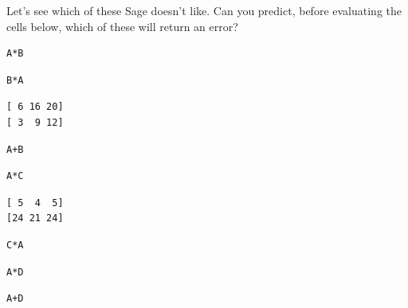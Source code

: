 \documentclass[10pt,]{book}
\theoremstyle{plain}
\theoremstyle{definition}
\numberwithin{equation}{section}
\begin{document}
      Let's see which of these Sage doesn't like. Can you predict, before
      evaluating the cells below, which of these will return an error?
\begin{lstlisting}[style=sageinput]
A*B
\end{lstlisting}
\begin{lstlisting}[style=sageinput]
B*A
\end{lstlisting}
\begin{lstlisting}[style=sageoutput]
[ 6 16 20]
[ 3  9 12]
\end{lstlisting}
\begin{lstlisting}[style=sageinput]
A+B
\end{lstlisting}
\begin{lstlisting}[style=sageinput]
A*C
\end{lstlisting}
\begin{lstlisting}[style=sageoutput]
[ 5  4  5]
[24 21 24]
\end{lstlisting}
\begin{lstlisting}[style=sageinput]
C*A
\end{lstlisting}
\begin{lstlisting}[style=sageinput]
A*D
\end{lstlisting}
\begin{lstlisting}[style=sageinput]
A+D
\end{lstlisting}
\typeout{************************************************}
\typeout{************************************************}
\end{document}
